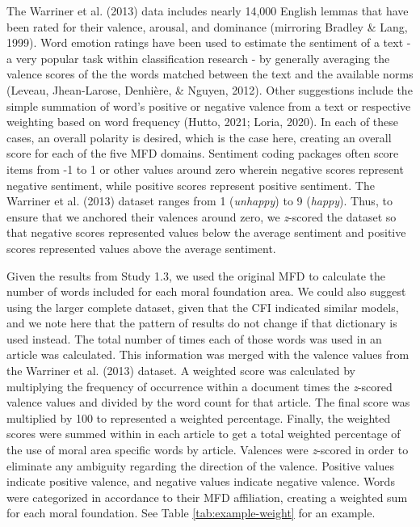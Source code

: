 \documentclass[
  man,floatsintext]{apa6}
\begin{document}
The Warriner et al. (2013) data includes nearly 14,000 English lemmas that have
been rated for their valence, arousal, and dominance (mirroring Bradley \& Lang, 1999). Word emotion ratings have been used to estimate the
sentiment of a text - a very popular task within classification
research - by generally averaging the valence scores of the the words
matched between the text and the available norms (Leveau, Jhean-Larose, Denhière, \& Nguyen, 2012). Other
suggestions include the simple summation of word's positive or negative
valence from a text or respective weighting based on word frequency
(Hutto, 2021; Loria, 2020). In each of these cases, an overall polarity is
desired, which is the case here, creating an overall score for each of
the five MFD domains. Sentiment coding packages often score items from
-1 to 1 or other values around zero wherein negative scores represent
negative sentiment, while positive scores represent positive sentiment.
The Warriner et al. (2013) dataset ranges from 1 (\emph{unhappy}) to 9 (\emph{happy}).
Thus, to ensure that we anchored their valences around zero, we
\emph{z}-scored the dataset so that negative scores represented values below
the average sentiment and positive scores represented values above the
average sentiment.

Given the results from Study 1.3, we used the original MFD to calculate
the number of words included for each moral foundation area. We could
also suggest using the larger complete dataset, given that the CFI indicated
similar models, and we note here that the pattern of results do not change
if that dictionary is used instead. The total number of times each of those words
was used in an article was calculated. This information was merged with
the valence values from the Warriner et al. (2013) dataset. A weighted score was
calculated by multiplying the frequency of occurrence within a document
times the \emph{z}-scored valence values and divided by the word count for
that article. The final score was multiplied by 100 to represented a
weighted percentage. Finally, the weighted scores were summed within in
each article to get a total weighted percentage of the use of moral area
specific words by article. Valences were \emph{z}-scored in order to
eliminate any ambiguity regarding the direction of the valence. Positive
values indicate positive valence, and negative values indicate negative
valence. Words were categorized in accordance to their MFD affiliation,
creating a weighted sum for each moral foundation. See Table
\ref{tab:example-weight} for an example.
\end{document}
